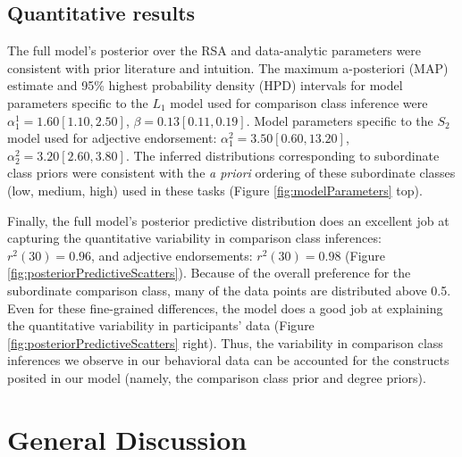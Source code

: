 \documentclass[doc]{apa6}
\begin{document}
\subsection{Quantitative results}

The full model's posterior over the RSA and data-analytic parameters were consistent with prior literature and intuition. The maximum a-posteriori (MAP) estimate and 95\% highest probability density (HPD) intervals for model parameters specific to the \(L_1\) model used for comparison class inference were \(\alpha^{1}_{1} = 1.60 [1.10, 2.50]\), \(\beta = 0.13 [0.11, 0.19]\). Model parameters specific to the \(S_2\) model used for adjective endorsement: \(\alpha^{2}_{1} = 3.50 [0.60, 13.20]\), \(\alpha^{2}_{2} = 3.20 [2.60, 3.80]\). The inferred distributions corresponding to subordinate class priors were consistent with the \emph{a priori} ordering of these subordinate classes (low, medium, high) used in these tasks (Figure \ref{fig:modelParameters} top).

Finally, the full model's posterior predictive distribution does an excellent job at capturing the quantitative variability in comparison class inferences: \(r^2(30) = 0.96\), and adjective endorsements: \(r^2(30) = 0.98\) (Figure \ref{fig:posteriorPredictiveScatters}). Because of the overall preference for the subordinate comparison class, many of the data points are distributed above 0.5. Even for these fine-grained differences, the model does a good job at explaining the quantitative variability in participants' data (Figure \ref{fig:posteriorPredictiveScatters} right). Thus, the variability in comparison class inferences we observe in our behavioral data can be accounted for the constructs posited in our model (namely, the comparison class prior and degree priors).

\section{General Discussion}



%
%
%
%
%
%
%
%
%
%

\end{document}
